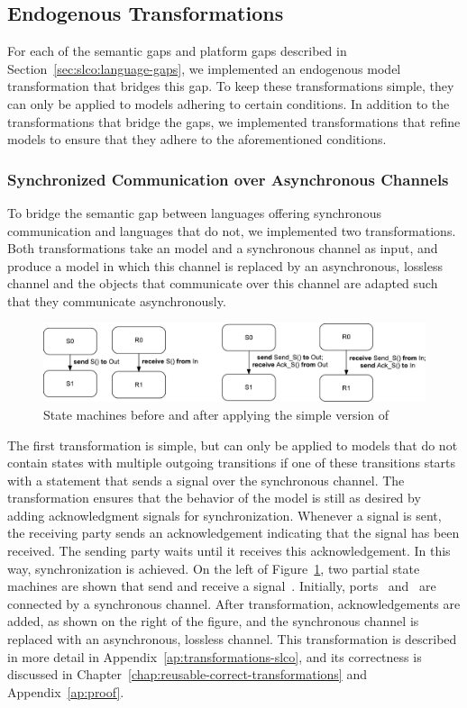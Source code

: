 \subsection{Endogenous Transformations}
\label{sec:slco:endogenous}
For each of the semantic gaps and platform gaps described in Section~\ref{sec:slco:language-gaps}, we implemented an endogenous model transformation that bridges this gap.
To keep these transformations simple, they can only be applied to models adhering to certain conditions.
In addition to the transformations that bridge the gaps, we implemented transformations that refine models to ensure that they adhere to the aforementioned conditions.

\subsubsection{Synchronized Communication over Asynchronous Channels}
\label{subsubsec:slco:sync2async}
To bridge the semantic gap between languages offering synchronous communication and languages that do not, we implemented two transformations.
Both transformations take an \SLCO model and a synchronous channel as input, and produce a model in which this channel is replaced by an asynchronous, lossless channel and the objects that communicate over this channel are adapted such that they communicate asynchronously.

\begin{figure}[hbt]
  \centering
  \includegraphics[scale=0.45]{slco/figs/transformations/s2a_simple}
  \caption{State machines before and after applying the simple version of }
  \label{fig:slco:trans:assimple}
\end{figure}

The first transformation is simple, but can only be applied to models that do not contain states with multiple outgoing transitions if one of these transitions starts with a statement that sends a signal over the synchronous channel.
The transformation ensures that the behavior of the model is still as desired by adding acknowledgment signals for synchronization.
Whenever a signal is sent, the receiving party sends an acknowledgement indicating that the signal has been received.
The sending party waits until it receives this acknowledgement.
In this way, synchronization is achieved.
On the left of Figure~\ref{fig:slco:trans:assimple}, two partial state machines are shown that send and receive a signal~.
Initially, ports~ and~ are connected by a synchronous channel.
After transformation, acknowledgements are added, as shown on the right of the figure, and the synchronous channel is replaced with an asynchronous, lossless channel.
This transformation is described in more detail in Appendix~\ref{ap:transformations-slco}, and its correctness is discussed in Chapter~\ref{chap:reusable-correct-transformations} and Appendix~\ref{ap:proof}.

